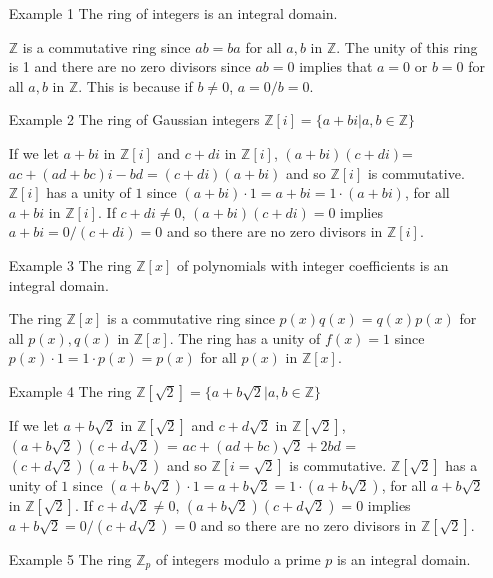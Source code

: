 \documentclass{article}
\newcommand{\Z}{\mathbb Z}
\begin{document}
\begin{enumerate}
    \begin{enumerate}
        \item[Example 1] The ring of integers is an integral domain.
        \begin{flushleft}
        $\Z$ is a commutative ring since $ab = ba$ for all $a, b $ in $ \Z$. The unity of this ring is 1 and there are no zero divisors since $ab = 0$ implies that $a = 0$ or $b = 0$ for all $a, b $ in $ \Z$. This is because if $b \not= 0$, $a = 0/b = 0$. 
        \end{flushleft}
        \item[Example 2] The ring of Gaussian integers $\Z[i] = \{a + bi | a, b \in \Z \}$
        \begin{flushleft}
        If we let $a + bi $ in $ \Z[i]$ and $c + di $ in $ \Z[i]$, $(a+bi)(c+di) $=$ ac + (ad + bc)i - bd = (c+di)(a+bi)$ and so $\Z[i]$ is commutative. $\Z[i]$ has a unity of $1$ since $(a + bi)\cdot 1 = a + bi = 1\cdot(a+bi)$, for all $a + bi $ in $ \Z[i]$. If $c + di \not= 0$, $(a+bi)(c+di) = 0$ implies $a+bi = 0/(c+di) = 0$ and so there are no zero divisors in $\Z[i]$.
        \end{flushleft}
        \item[Example 3] The ring $\Z[x]$ of polynomials with integer coefficients is an integral domain.
        \begin{flushleft}
        The ring $\Z[x]$ is a commutative ring since $p(x)q(x) = q(x)p(x)$ for all $p(x),q(x)$ in $\Z[x]$. The ring has a unity of $f(x) = 1$ since $p(x)\cdot 1 = 1 \cdot p(x) = p(x)$ for all $p(x)$ in $\Z[x]$.
        \end{flushleft}
        \item[Example 4] The ring $\Z[\sqrt{2}] = \{a + b\sqrt{2} | a, b \in \Z \}$
        \begin{flushleft}
        If we let $a + b\sqrt{2} $ in $ \Z[\sqrt{2}]$ and $c + d\sqrt{2} $ in $ \Z[\sqrt{2}]$, $(a+b\sqrt{2})(c+d\sqrt{2}) $ = $ ac + (ad + bc)\sqrt{2} + 2bd $ = $ (c+d\sqrt{2})(a+b\sqrt{2})$ and so $\Z[i=\sqrt{2}]$ is commutative. $\Z[\sqrt{2}]$ has a unity of $1$ since $(a + b\sqrt{2})\cdot 1 = a + b\sqrt{2} = 1\cdot(a+b\sqrt{2})$, for all $a + b\sqrt{2} $ in $ \Z[\sqrt{2}]$. If $c + d\sqrt{2} \not= 0$, $(a+b\sqrt{2})(c+d\sqrt{2}) = 0$ implies $a+b\sqrt{2} = 0/(c+d\sqrt{2}) = 0$ and so there are no zero divisors in $\Z[\sqrt{2}]$.
        \end{flushleft}
        \item[Example 5] The ring $\Z_p$ of integers modulo a prime $p$ is an integral domain.

\end{enumerate}
\end{enumerate}
\end{document}

